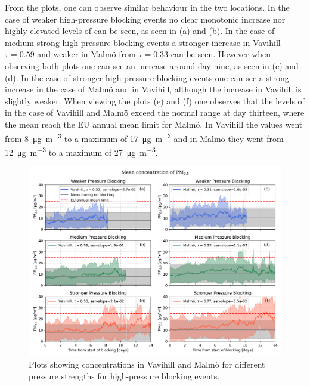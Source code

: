 From the plots, one can observe similar behaviour in the two locations. In the case of weaker high-pressure blocking events no clear monotonic increase nor highly elevated levels of \PM can be seen, as seen in (a) and (b). In the case of medium strong high-pressure blocking events a stronger increase in Vavihill $\tau=0.59$ and weaker in Malmö from $\tau=0.33$ can be seen. However when observing both plots one can see an increase around day nine, as seen in (c) and (d). In the case of stronger high-pressure blocking events one can see a strong increase in the case of Malmö and in Vavihill, although the increase in Vavihill is slightly weaker. When viewing the plots (e) and (f) one observes that the levels of \PM in the case of Vavihill and Malmö exceed the normal range at day thirteen, where the mean reach the EU annual mean limit for Malmö. In Vavihill the values went from \SI{8}{\micro\gram\per\meter\cubed} to a maximum of \SI{17}{\micro\gram\per\meter\cubed} and in Malmö they went from \SI{12}{\micro\gram\per\meter\cubed} to a maximum of \SI{27}{\micro\gram\per\meter\cubed}. 


\begin{figure}[H]
        \centering
        \includegraphics[width=\textwidth]{Figures/Meanplot_pressure.png}
        \caption{Plots showing \PM concentrations in Vavihill and Malmö for different pressure strengths for high-pressure blocking events.}
        \label{fig:Meanplot_pressure}
\end{figure}

 

